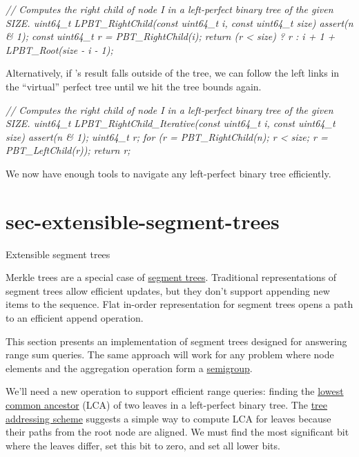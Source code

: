\documentclass{article}
\begin{document}
\begin{code}[c]
\em{// Computes the right child of node I in a left-perfect binary tree of the given SIZE.}
uint64_t LPBT_RightChild(const uint64_t i, const uint64_t size) {
    assert(n & 1);
    const uint64_t r = PBT_RightChild(i);
    return (r < size) ? r : i + 1 + LPBT_Root(size - i - 1);
}
\end{code}

Alternatively, if 's result falls outside of the tree, we can follow the left links in the ``virtual'' perfect tree until we hit the tree bounds again.

\begin{code}[c]
\em{// Computes the right child of node I in a left-perfect binary tree of the given SIZE.}
uint64_t LPBT_RightChild_Iterative(const uint64_t i, const uint64_t size) {
    assert(n & 1);
    uint64_t r;
    for (r = PBT_RightChild(n); r < size; r = PBT_LeftChild(r));
    return r;
}
\end{code}

We now have enough tools to navigate any left-perfect binary tree efficiently.

\section{sec-extensible-segment-trees}{Extensible segment trees}

Merkle trees are a special case of \href{https://cp-algorithms.com/data_structures/segment_tree.html}{segment trees}.
Traditional representations of segment trees allow efficient updates, but they don't support appending new items to the sequence.
Flat in-order representation for segment trees opens a path to an efficient append operation.

This section presents an implementation of segment trees designed for answering range sum queries.
The same approach will work for any problem where node elements and the aggregation operation form a \href{https://en.wikipedia.org/wiki/Semigroup}{semigroup}.

We'll need a new operation to support efficient range queries: finding the \href{https://en.wikipedia.org/wiki/Lowest_common_ancestor}{lowest common ancestor} (LCA) of two leaves in a left-perfect binary tree.
The \href{#sec-addressing}{tree addressing scheme} suggests a simple way to compute LCA for leaves because their paths from the root node are aligned.
We must find the most significant bit where the leaves differ, set this bit to zero, and set all lower bits.
\end{document}
